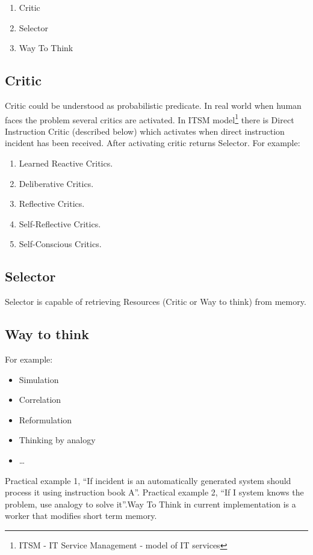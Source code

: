 \documentclass[runningheads,a4paper]{llncs}
\begin{document}
\begin{enumerate}
 \item Critic
 \item Selector
 \item Way To Think
\end{enumerate}

\subsection{Critic}
Critic could be understood as probabilistic predicate. In real world when human faces the problem several critics are activated. In ITSM model\footnote{ITSM - IT Service Management - model of IT services} there is Direct Instruction Critic (described below) which activates when direct instruction incident has been received. After activating critic returns Selector.
For example:

\begin{enumerate}
 \item Learned Reactive Critics.
 \item Deliberative Critics.
 \item Reflective Critics.
 \item Self-Reflective Critics.
 \item Self-Conscious Critics.
\end{enumerate}

\subsection{Selector}
Selector is capable of retrieving Resources (Critic or Way to think) from memory.

\subsection{Way to think}

For example:
\begin{itemize}
 \item Simulation
 \item Correlation
 \item Reformulation
 \item Thinking by analogy
 \item …
\end{itemize}

Practical example 1, “If incident is an automatically generated system should process it using instruction book A”.
Practical example 2, “If I system knows the problem, use analogy to solve it”.Way To Think in current implementation is a worker that modifies short term memory.
\end{document}
